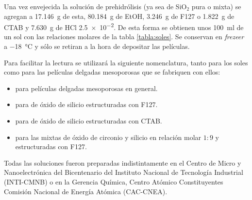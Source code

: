 			Una vez envejecida la solución de prehidrólisis (ya sea de SiO$_2$ pura o mixta) se agregan a \SI{17.146}{\gram} de esta, \SI{80.184}{\gram} de EtOH, \SI{3.246}{\gram} de F127 o \SI{1.822}{\gram} de CTAB y \SI{7.630}{\gram} de HCl \SI{2,5e-2}{\Molar}. De esta forma se obtienen unos \SI{100}{\ml} de un sol con las relaciones molares de la tabla \ref{tabla:soles}. Se conservan en \textit{frezeer} a \SI{-18}{\celsius} y sólo se retiran a la hora de depositar las películas. 

			Para facilitar la lectura se utilizará la siguiente nomenclatura, tanto para los soles como para las películas delgadas mesoporosas que se fabriquen con ellos: 

				\begin{itemize}
			 			\item \pdm\space para películas delgadas mesoporosas en general.
			 			\item \pdmF\space para \pdm\space de óxido de silicio estructuradas con F127. 
			 			\item \pdmC\space para \pdm\space de óxido de silicio estructuradas con CTAB.
			 			\item \pdmZ\space para las \pdm\space mixtas de óxido de circonio y silicio en relación molar $1\!:\!9$ y estructuradas con F127. 
					    \end{itemize}	
			
			Todas las soluciones fueron preparadas indistintamente en el Centro de Micro y Nanoelectrónica del Bicentenario del Instituto Nacional de Tecnología Industrial (INTI-CMNB) o en la Gerencia Química, Centro Atómico Constituyentes Comisión Nacional de Energía Atómica (CAC-CNEA). 
					
